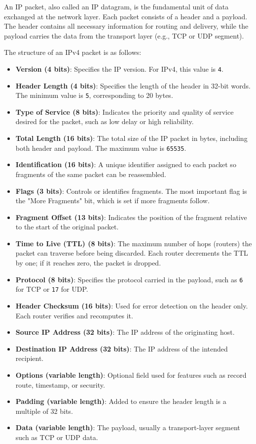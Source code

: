 An IP packet, also called an IP datagram, is the fundamental unit of data exchanged at the network layer. Each packet consists of a header and a payload. The header contains all necessary information for routing and delivery, while the payload carries the data from the transport layer (e.g., TCP or UDP segment).

The structure of an IPv4 packet is as follows:

\begin{itemize}
    \item \textbf{Version (4 bits)}: Specifies the IP version. For IPv4, this value is \texttt{4}.
    \item \textbf{Header Length (4 bits)}: Specifies the length of the header in 32-bit words. The minimum value is \texttt{5}, corresponding to 20 bytes.
    \item \textbf{Type of Service (8 bits)}: Indicates the priority and quality of service desired for the packet, such as low delay or high reliability.
    \item \textbf{Total Length (16 bits)}: The total size of the IP packet in bytes, including both header and payload. The maximum value is \texttt{65535}.
    \item \textbf{Identification (16 bits)}: A unique identifier assigned to each packet so fragments of the same packet can be reassembled.
    \item \textbf{Flags (3 bits)}: Controls or identifies fragments. The most important flag is the "More Fragments" bit, which is set if more fragments follow.
    \item \textbf{Fragment Offset (13 bits)}: Indicates the position of the fragment relative to the start of the original packet.
    \item \textbf{Time to Live (TTL) (8 bits)}: The maximum number of hops (routers) the packet can traverse before being discarded. Each router decrements the TTL by one; if it reaches zero, the packet is dropped.
    \item \textbf{Protocol (8 bits)}: Specifies the protocol carried in the payload, such as \texttt{6} for TCP or \texttt{17} for UDP.
    \item \textbf{Header Checksum (16 bits)}: Used for error detection on the header only. Each router verifies and recomputes it.
    \item \textbf{Source IP Address (32 bits)}: The IP address of the originating host.
    \item \textbf{Destination IP Address (32 bits)}: The IP address of the intended recipient.
    \item \textbf{Options (variable length)}: Optional field used for features such as record route, timestamp, or security.
    \item \textbf{Padding (variable length)}: Added to ensure the header length is a multiple of 32 bits.
    \item \textbf{Data (variable length)}: The payload, usually a transport-layer segment such as TCP or UDP data.
\end{itemize}

